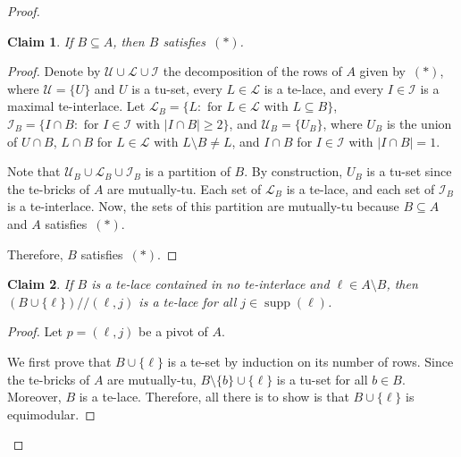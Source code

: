 \documentclass[11pt,a4paper]{amsart}
\renewcommand*{\geq}{\geqslant}
\theoremstyle{plain}
\newtheorem{claimnumb}{Claim}[theorem]{\itshape}{\rmfamily}
\theoremstyle{definition}
\newcommand{\cal}[1]{\mathcal{#1}}
\DeclareMathOperator{\supp}{supp}
\renewcommand{\cal}[1]{\mathcal{#1}}
\begin{document}
\begin{proof}
\begin{claimnumb}\label{cl1.0}
If $B\subseteq A$, then $B$ satisfies~$(\ast)$. 
\end{claimnumb}
\begin{proof}
Denote by $\cal U\cup \cal L \cup \cal I$ the decomposition of the rows of $A$ given by~$(\ast)$, where $\cal U=\{U\}$ and $U$ is a tu-set, every $L\in \cal L$ is a te-lace, and every $I\in\cal I$ is a maximal te-interlace.
Let $\mathcal{L}_B= \{L: \text{ for $L\in\cal L$ with $L\subseteq B$}\}$, $\mathcal{I}_B= \{I\cap B: \text{ for $I\in\cal I$ with $|I\cap B|\geq 2$}\}$, and $\cal U_B=\{U_B\}$, where $U_B$ is the union of $U\cap B$, $L\cap B$ for $L\in\mathcal{L}$ with $L\setminus B \neq L$, and $I\cap B$ for $I\in\mathcal{I}$ with $|I\cap B| = 1$.

Note that $\cal U_B\cup\mathcal{L}_B\cup \mathcal{I}_B$ is a partition of $B$.
By construction, $U_B$ is a tu-set since the te-bricks of $A$ are mutually-tu. 
Each set of $\mathcal{L}_B$ is a te-lace, and each set of $\mathcal{I}_B$ is a te-interlace.
Now, the sets of this partition are mutually-tu because $B\subseteq A$ and $A$ satisfies~$(\ast)$.

Therefore, $B$ satisfies~$(\ast)$.
\end{proof}

\begin{claimnumb}\label{cl1.1}
If $B$ is a te-lace contained in no te-interlace and $\ell\in A\setminus B$, then $(B\cup \{\ell\})/\!\!/(\ell,j)$ is a te-lace for all $j\in\supp(\ell)$.
\end{claimnumb}
\begin{proof}
Let $p=(\ell,j)$ be a pivot of $A$.

We first prove that $B\cup \{\ell\}$ is a te-set by induction on its number of rows.
Since the te-bricks of $A$ are mutually-tu, $B\setminus\{b\}\cup\{\ell\}$ is a tu-set for all $b\in B$. Moreover, $B$ is a te-lace.
Therefore, all there is to show is that $B\cup \{\ell\}$ is equimodular.


\end{proof}
\end{proof}
\end{document}
